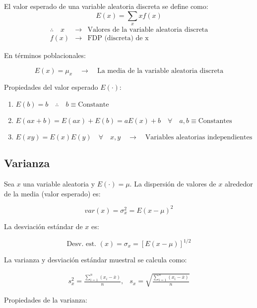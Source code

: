 \documentclass[
]{book}
\providecommand{\tightlist}{%
  \setlength{\itemsep}{0pt}\setlength{\parskip}{0pt}}
\begin{document}
El valor esperado de una variable aleatoria discreta se define como:
\[
E(x) = \sum_x xf(x)
\]
\[
\begin{array}{ccc}
\therefore \quad x & \rightarrow & \text{Valores de la variable aleatoria discreta} \\
f(x) & \rightarrow & \text{FDP (discreta) de x}
\end{array}
\]

En términos poblacionales:

\[
E(x) = \mu_x \quad \rightarrow \quad \text{La media de la variable aleatoria discreta}
\]

Propiedades del valor esperado \(E(\cdot)\):

\begin{enumerate}
\def\labelenumi{\arabic{enumi}.}
\tightlist
\item
  \(E(b) = b \quad \therefore \quad b \equiv \text{Constante}\)
\item
  \(E(ax + b) = E(ax) + E(b) = aE(x) + b \quad \forall \quad a,b\equiv \text{Constantes}\)
\item
  \(E(xy) = E(x)E(y) \quad \forall \quad x,y \quad \rightarrow \quad \text{Variables aleatorias independientes}\)
\end{enumerate}

\hypertarget{varianza}{%
\subsection{Varianza}\label{varianza}}

Sea \(x\) una variable aleatoria y \(E(\cdot) = \mu\). La dispersión de valores de \(x\) alrededor de la media (valor esperado) es:

\[
var(x) = \sigma_x^2 = E(x-\mu)^2
\]

La desviación estándar de \(x\) es:

\[
\text{Desv. est. }(x) = \sigma_x = [E(x-\mu)]^{1/2}
\]

La varianza y desviación estándar muestral se calcula como:

\[
\begin{array}{cc}
s_x^2 = \frac{\sum_{i=1}^n (x_i - \bar x)}{n}, & s_x = \sqrt{\frac{\sum_{i=1}^n (x_i - \bar x)}{n}}
\end{array}
\]

Propiedades de la varianza:
\end{document}
